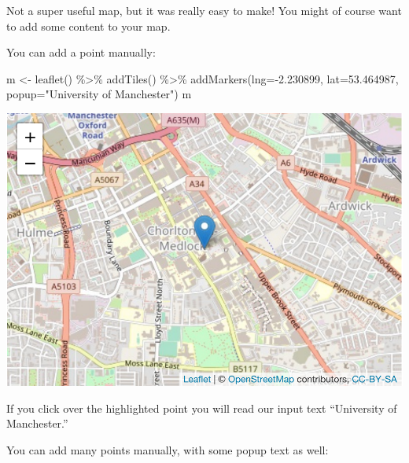 \documentclass[
]{book}
\newenvironment{Shaded}{\begin{snugshade}}{\end{snugshade}}
\newcommand{\AttributeTok}[1]{\textcolor[rgb]{0.77,0.63,0.00}{#1}}
\newcommand{\FloatTok}[1]{\textcolor[rgb]{0.00,0.00,0.81}{#1}}
\newcommand{\FunctionTok}[1]{\textcolor[rgb]{0.00,0.00,0.00}{#1}}
\newcommand{\NormalTok}[1]{#1}
\newcommand{\OtherTok}[1]{\textcolor[rgb]{0.56,0.35,0.01}{#1}}
\newcommand{\SpecialCharTok}[1]{\textcolor[rgb]{0.00,0.00,0.00}{#1}}
\newcommand{\StringTok}[1]{\textcolor[rgb]{0.31,0.60,0.02}{#1}}
\begin{document}
Not a super useful map, but it was really easy to make! You might of course want to add some content to your map.

You can add a point manually:

\begin{Shaded}
\begin{Highlighting}[]
\NormalTok{m }\OtherTok{\textless{}{-}} \FunctionTok{leaflet}\NormalTok{() }\SpecialCharTok{\%\textgreater{}\%}
  \FunctionTok{addTiles}\NormalTok{()  }\SpecialCharTok{\%\textgreater{}\%} 
  \FunctionTok{addMarkers}\NormalTok{(}\AttributeTok{lng=}\SpecialCharTok{{-}}\FloatTok{2.230899}\NormalTok{, }\AttributeTok{lat=}\FloatTok{53.464987}\NormalTok{, }\AttributeTok{popup=}\StringTok{"University of Manchester"}\NormalTok{)}
\NormalTok{m  }
\end{Highlighting}
\end{Shaded}

\includegraphics{crime_mapping_files/figure-latex/unnamed-chunk-49-1.pdf}

If you click over the highlighted point you will read our input text ``University of Manchester.''

You can add many points manually, with some popup text as well:
\end{document}
